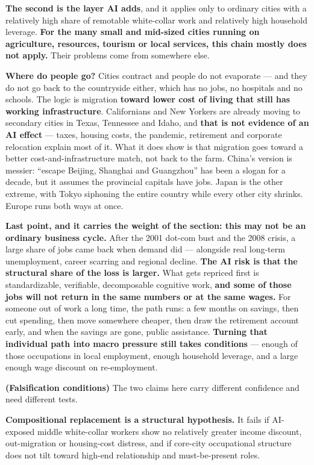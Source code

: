 \documentclass[11pt,a4paper]{article}
\begin{document}
\textbf{The second is the layer AI adds}, and it applies only to ordinary cities with a relatively high share of remotable white-collar work and relatively high household leverage. \textbf{For the many small and mid-sized cities running on agriculture, resources, tourism or local services, this chain mostly does not apply.} Their problems come from somewhere else.

\textbf{Where do people go?} Cities contract and people do not evaporate --- and they do not go back to the countryside either, which has no jobs, no hospitals and no schools. The logic is migration \textbf{toward lower cost of living that still has working infrastructure}. Californians and New Yorkers are already moving to secondary cities in Texas, Tennessee and Idaho, and \textbf{that is not evidence of an AI effect} --- taxes, housing costs, the pandemic, retirement and corporate relocation explain most of it. What it does show is that migration goes toward a better cost-and-infrastructure match, not back to the farm. China's version is messier: ``escape Beijing, Shanghai and Guangzhou'' has been a slogan for a decade, but it assumes the provincial capitals have jobs. Japan is the other extreme, with Tokyo siphoning the entire country while every other city shrinks. Europe runs both ways at once.

\textbf{Last point, and it carries the weight of the section: this may not be an ordinary business cycle.} After the 2001 dot-com bust and the 2008 crisis, a large share of jobs came back when demand did --- alongside real long-term unemployment, career scarring and regional decline. \textbf{The AI risk is that the structural share of the loss is larger.} What gets repriced first is standardizable, verifiable, decomposable cognitive work, \textbf{and some of those jobs will not return in the same numbers or at the same wages.} For someone out of work a long time, the path runs: a few months on savings, then cut spending, then move somewhere cheaper, then draw the retirement account early, and when the savings are gone, public assistance. \textbf{Turning that individual path into macro pressure still takes conditions} --- enough of those occupations in local employment, enough household leverage, and a large enough wage discount on re-employment.

\textbf{(Falsification conditions)} The two claims here carry different confidence and need different tests.

\textbf{Compositional replacement is a structural hypothesis.} It fails if AI-exposed middle white-collar workers show no relatively greater income discount, out-migration or housing-cost distress, and if core-city occupational structure does not tilt toward high-end relationship and must-be-present roles.
\end{document}
